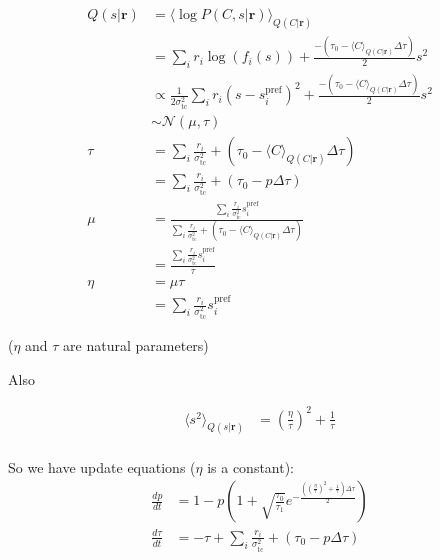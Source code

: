 \documentclass[12pt]{article}
\begin{document}
\begin{equation}
\begin{aligned}
Q(s|\mathbf{r}) &= \langle \log P(C, s|\mathbf{r}) \rangle_{Q(C|\mathbf{r})}\\
&= \sum_i r_i \log(f_i(s)) + \frac{- (\tau_0 - \langle C \rangle_{Q(C|\mathbf{r})} \Delta \tau)}{2} s^2\\
&\propto \frac{1}{2 \sigma^2_{\text{tc}}} \sum_i r_i (s - s_i^{\text{pref}})^2 + \frac{- (\tau_0 - \langle C \rangle_{Q(C|\mathbf{r})} \Delta \tau)}{2} s^2\\
&\sim \mathcal{N} (\mu, \tau)\\
\tau &= \sum_i \frac{r_i}{\sigma^2_{\text{tc}}}+ (\tau_0 - \langle C \rangle_{Q(C|\mathbf{r})} \Delta \tau)\\
&= \sum_i \frac{r_i}{\sigma^2_{\text{tc}}}+ (\tau_0 - p \Delta \tau)\\
\mu &= \frac{\sum_i \frac{r_i}{\sigma^2_{\text{tc}}}s_i^{\text{pref}}}{\sum_i \frac{r_i}{\sigma^2_{\text{tc}}}+ (\tau_0 - \langle C \rangle_{Q(C|\mathbf{r})} \Delta \tau)}\\
&= \frac{\sum_i \frac{r_i}{\sigma^2_{\text{tc}}}s_i^{\text{pref}}}{\tau}\\
\eta &= \mu \tau\\
&= \sum_i \frac{r_i}{\sigma^2_{\text{tc}}}s_i^{\text{pref}}
\end{aligned}
\end{equation}

($\eta$ and $\tau$ are natural parameters)

Also

\begin{equation}
\begin{aligned}
\langle s^2 \rangle_{Q(s|\mathbf{r})} &= (\frac{\eta}{\tau})^2 + \frac{1}{\tau}\\
\end{aligned}
\end{equation}

So we have update equations ($\eta$ is a constant):
\begin{equation}
\begin{aligned}
\frac{dp}{dt} &= 1 - p(1 + \sqrt{\frac{\tau_0}{\tau_1}} e^{-\frac{((\frac{\eta}{\tau})^2 + \frac{1}{\tau}) \Delta \tau}{2}})\\
\frac{d \tau}{dt} &= -\tau + \sum_i \frac{r_i}{\sigma^2_{\text{tc}}}+ (\tau_0 - p \Delta \tau)\\
\end{aligned}
\end{equation}
\end{document}
